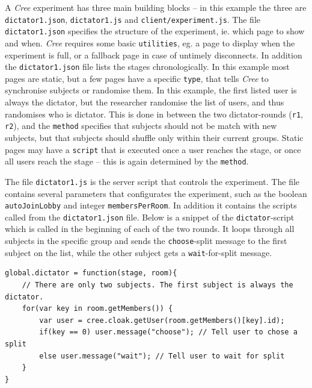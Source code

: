 \documentclass[preprint, 12pt]{elsarticle}
\newcommand{\Cree}{\emph{Cree}\xspace}
\begin{document}
A \Cree experiment has three main building blocks -- in this example the three are \texttt{dictator1.json}, \texttt{dictator1.js} and \texttt{client/experiment.js}. The file \texttt{dictator1.json} specifies the structure of the experiment, ie. which page to show and when. \Cree requires some basic \texttt{utilities}, eg. a page to display when the experiment is full, or a fallback page in case of untimely disconnects. In addition the \texttt{dictator1.json} file lists the stages chronologically. In this example most pages are static, but a few pages have a specific \texttt{type}, that tells \Cree to synchronise subjects or randomise them. In this example, the first listed user is always the dictator, but the researcher randomise the list of users, and thus randomises who is dictator. This is done in between the two dictator-rounds (\texttt{r1}, \texttt{r2}), and the \texttt{method} specifies that subjects should not be match with new subjects, but that subjects should shuffle only within their current groups. Static pages may have a \texttt{script} that is executed once a user reaches the stage, or once all users reach the stage -- this is again determined by the \texttt{method}.


%
%

The file \texttt{dictator1.js} is the server script that controls the experiment. The file contains several parameters that configurates the experiment, such as the boolean \texttt{autoJoinLobby} and integer \texttt{membersPerRoom}. In addition it contains the scripts called from the \texttt{dictator1.json} file. Below is a snippet of the \texttt{dictator}-script which is called in the beginning of each of the two rounds. It loops through all subjects in the specific group and sends the \texttt{choose}-split message to the first subject on the list, while the other subject gets a \texttt{wait}-for-split message.

\begin{lstlisting}[caption={Snippet from the server script -- \texttt{dictator1.js}},label=server]
global.dictator = function(stage, room){
	// There are only two subjects. The first subject is always the dictator.
	for(var key in room.getMembers()) {
		var user = cree.cloak.getUser(room.getMembers()[key].id);
		if(key == 0) user.message("choose"); // Tell user to chose a split
		else user.message("wait"); // Tell user to wait for split
	}
}
\end{lstlisting}
\end{document}
